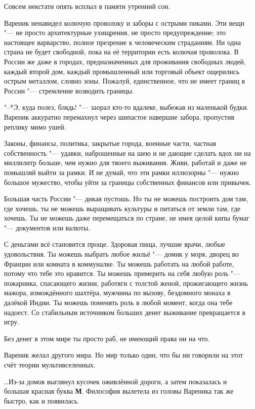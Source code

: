 Совсем некстати опять всплыл в памяти утренний сон.

Вареник ненавидел колючую проволоку и заборы с острыми пиками.
Эти вещи "--- не просто архитектурные ухищрения, не просто предупреждение;
это настоящее варварство, полное презрение к человеческим страданиям.
Ни одна страна не будет свободной, пока на её территории есть колючая проволока.
В России же даже в городах, предназначенных для проживания свободных людей, каждый второй дом, каждый промышленный или торговый объект ощерились острым металлом, словно зоны.
Пожалуй, единственное, что не имеет границ в России "--- стремление возводить границы.

"--*Э, куда полез, блядь! "--- заорал кто-то вдалеке, выбежав из маленькой будки.
Вареник аккуратно перемахнул через шипастое навершие забора, пропустив реплику мимо ушей.

Законы, финансы, политика, закрытые города, военные части, частная собственность "--- удавки, наброшенные на шею и не дающие сделать вдох ни на миллилитр больше, чем нужно для твоего выживания.
Живи, работай и даже не помышляй выйти за рамки.
И не думай, что эти рамки иллюзорны "--- нужно большое мужество, чтобы уйти за границы собственных финансов или привычек.

Большая часть России "--- дикая пустошь.
Но ты не можешь построить дом там, где хочешь, ты не можешь выращивать культуры и питаться от земли там, где хочешь.
Ты не можешь даже перемещаться по стране, не имея целой кипы бумаг "--- документов или валюты.

С деньгами всё становится проще.
Здоровая пища, лучшие врачи, любые удовольствия.
Ты можешь выбрать любое жильё "--- домик у моря, дворец во Франции или комната в коммуналке.
Ты можешь работать на любой работе, потому что тебе это нравится.
Ты можешь примерить на себя любую роль "--- пожарника, спасающего жизни, работяги с толстой женой, прожигающего жизнь мажора, измождённого шахтёра, мужчины по вызову, бездомного монаха в далёкой Индии.
Ты можешь поменять роль в любой момент, когда она тебе надоест.
Со стабильным источником больших денег выживание превращается в игру.

Без денег в этом мире ты просто раб, не имеющий права ни на что.

Вареник желал другого мира.
Но мир только один, что бы ни говорили на этот счёт теории мультивселенных.

\ldots{}Из-за домов выглянул кусочек оживлённой дороги, а затем показалась и большая красная буква \textbf{М}.
Философия вылетела из головы Вареника так же быстро, как и появилась.

